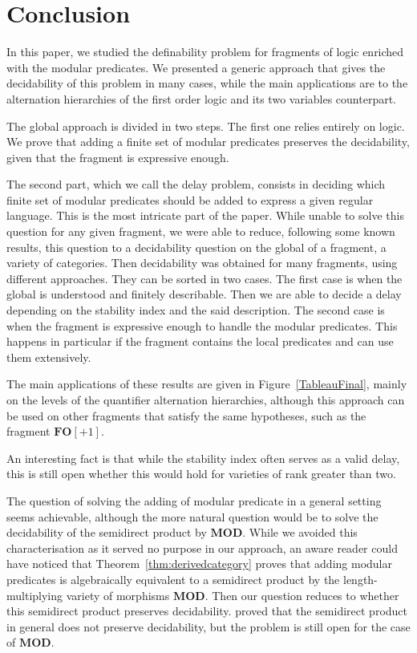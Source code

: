 \documentclass[submission,hidelink]{dmtcs-episciences}
\newcommand{\FO}{\mathbf{FO}}
\newcommand{\MODV}{\mathbf{MOD}}
\begin{document}
\section{Conclusion}\label{Section:Concl}
In this paper, we studied the definability problem for fragments of logic enriched with the modular predicates.
We presented a generic approach that gives the decidability of this problem in many cases, while the main applications are to the alternation hierarchies of the first order logic and its two variables counterpart.

The global approach is divided in two steps.
The first one relies entirely on logic.
We prove that adding a finite set of modular predicates preserves the decidability, given that the fragment is expressive enough.

The second part, which we call the delay problem, consists in deciding which finite set of modular predicates should be added to express a given regular language.
This is the most intricate part of the paper.
While unable to solve this question for any given fragment, we were able to reduce, following some known results, this question to a decidability question on the global of a fragment, a variety of categories.
Then decidability was obtained for many fragments, using different approaches.
They can be sorted in two cases.
The first case is when the global is understood and finitely describable.
Then we are able to decide a delay depending on the stability index and the said description.
The second case is when the fragment is expressive enough to handle the modular predicates.
This happens in particular if the fragment contains the local predicates and can use them extensively.

The main applications of these results are given in Figure~\ref{TableauFinal}, mainly on the levels of the quantifier alternation hierarchies, although this approach can be used on other fragments that satisfy the same hypotheses, such as the fragment $\FO[+1]$.

An interesting fact is that while the stability index often serves as a valid delay, this is still open whether this would hold for varieties of rank greater than two.

The question of solving the adding of modular predicate in a general setting seems achievable, although the more natural question would be to solve the decidability of the semidirect product by $\MODV$.
While we avoided this characterisation as it served no purpose in our approach, an aware reader could have noticed that Theorem~\ref{thm:derivedcategory}
proves that adding modular predicates is algebraically equivalent to a semidirect product by the length-multiplying variety of morphisms $\MODV$.
Then our question reduces to whether this semidirect product preserves decidability.
\cite{Auinger10} proved that the semidirect product in general does not preserve decidability, but the problem is still open for the case of $\MODV$.



\end{document}
